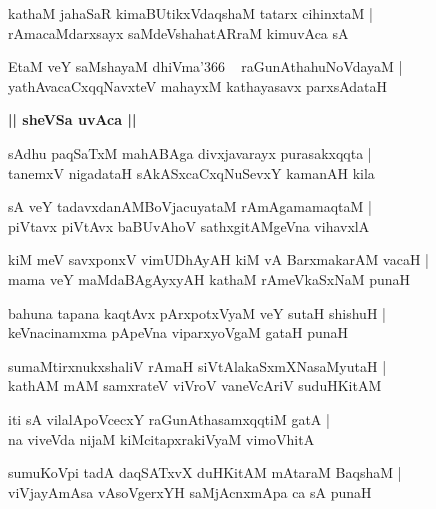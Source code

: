 \documentclass[twoside,12pt,openright]{book}
\newcounter{shloka}[chapter]
\def\uvaca#1{\centerline{{\large\textbf{#1}}}}
\begin{document}
\begin{shloka}%
kathaM jahaSaR kimaBUtikxVdaqshaM tatarx cihinxtaM |\\
rAmacaMdarxsayx saMdeVshahatARraM kimuvAca sA
\end{shloka}

\begin{shloka}%
EtaM veY saMshayaM dhiVma\char'366 ~ raGunAthahuNoVdayaM |\\
yathAvacaCxqqNavxteV mahayxM kathayasavx parxsAdataH 
\end{shloka}

\uvaca{|| sheVSa uvAca ||}

\begin{shloka}%
sAdhu paqSaTxM mahABAga divxjavarayx purasakxqqta |\\
tanemxV nigadataH sAkASxcaCxqNuSevxY kamanAH kila
\end{shloka}

\begin{shloka}%
sA veY tadavxdanAMBoVjacuyataM rAmAgamamaqtaM |\\
piVtavx piVtAvx baBUvAhoV sathxgitAMgeVna vihavxlA
\end{shloka}

\begin{shloka}%
kiM meV savxponxV vimUDhAyAH kiM vA BarxmakarAM vacaH |\\
mama veY maMdaBAgAyxyAH kathaM rAmeVkaSxNaM punaH 
\end{shloka}

\begin{shloka}%
bahuna tapana kaqtAvx pArxpotxVyaM veY sutaH shishuH |\\
keVnacinamxma pApeVna viparxyoVgaM gataH punaH  
\end{shloka}

\begin{shloka}%
sumaMtirxnukxshaliV rAmaH siVtAlakaSxmXNasaMyutaH |\\
kathAM mAM samxrateV viVroV vaneVcAriV suduHKitAM 
\end{shloka}

\begin{shloka}%
iti sA vilalApoVcecxY raGunAthasamxqqtiM gatA |\\
na viveVda nijaM kiMcitapxrakiVyaM vimoVhitA 
\end{shloka}

\begin{shloka}%
sumuKoVpi tadA daqSATxvX duHKitAM mAtaraM BaqshaM |\\
viVjayAmAsa vAsoVgerxYH saMjAcnxmApa ca sA punaH 
\end{shloka}
\end{document}
